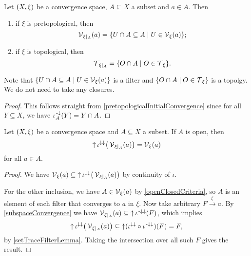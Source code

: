 \begin{lemma}
Let $\sSet{X,\xi}$ be a convergence space, $A\subseteq X$ a subset and $a\in A$. Then
\begin{enumerate}
\item if $\xi$ is pretopological, then
\[ \vicinities_{\xi|_A}(a) = \setbuilder{U\cap A\subseteq A}{U\in \vicinities_{\xi}(a)}; \]
\item if $\xi$ is topological, then
\[ \topology_{\xi|_A} = \setbuilder{O\cap A}{O\in \topology_{\xi}}. \]
\end{enumerate}
Note that $\setbuilder{U\cap A\subseteq A}{U\in \vicinities_{\xi}(a)}$ is a filter and $\setbuilder{O\cap A}{O\in \topology_{\xi}}$ is a topolgy. We do not need to take any closures.
\end{lemma}
\begin{proof}
This follows straight from \ref{pretopologicalInitialConvergence} since for all $Y\subseteq X$, we have $\operatorname{\iota}_A^{\text{\hspace{0.15em}-}\downarrow}(Y) = Y\cap A$.
\end{proof}

\begin{proposition} \label{subspaceVicinityFilter}
Let $\sSet{X,\xi}$ be a convergence space and $A\subseteq X$ a subset. If $A$ is open, then
\[ \operatorname{\uparrow}\iota^{\downarrow\downarrow}\big(\operatorname{\mathcal{V}}_{\xi|_A}(a)\big) = \operatorname{\mathcal{V}}_\xi(a) \]
for all $a\in A$.
\end{proposition}
\begin{proof}
We have $\operatorname{\mathcal{V}}_\xi(a) \subseteq \operatorname{\uparrow}\iota^{\downarrow\downarrow}\big(\operatorname{\mathcal{V}}_{\xi|_A}(a)\big)$ by continuity of $\iota$.

For the other inclusion, we have $A\in \operatorname{\mathcal{V}}_\xi(a)$ by \ref{openClosedCriteria}, so $A$ is an element of each filter that converges to $a$ in $\xi$. Now take arbitrary $F\overset{\xi}{\longrightarrow} a$. By \ref{subspaceConvergence} we have $\operatorname{\mathcal{V}}_{\xi|_A}(a) \subseteq \operatorname{\uparrow} \iota^{{\text{\hspace{0.15em}-}\downarrow}\downarrow}(F)$, which implies
\[ \operatorname{\uparrow} \iota^{\downarrow\downarrow}\big(\operatorname{\mathcal{V}}_{\xi|_A}(a)\big) \subseteq \operatorname{\uparrow} (\iota^{\downarrow\downarrow}\circ \iota^{{\text{\hspace{0.15em}-}\downarrow}\downarrow})(F) = F, \]
by \ref{setTraceFilterLemma}. Taking the intersection over all such $F$ gives the result.
\end{proof}

